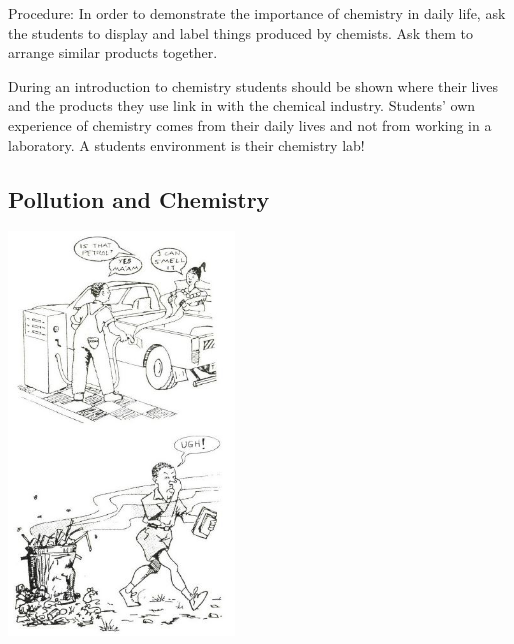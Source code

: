 \begin{multicols}{2}
\begin{description*}
\item[Procedure:]{In order to demonstrate the importance of
chemistry in daily life, ask the students to display
and label things produced by chemists. Ask
them to arrange similar products together.}
\end{description*}

\columnbreak

During an introduction to chemistry students
should be shown where their lives and the
products they use link in with the chemical
industry.
Students' own experience of chemistry comes
from their daily lives and not from working in a
laboratory. A students environment is their
chemistry lab!

\subsection{Pollution and Chemistry} 

\begin{center}
\includegraphics[width=0.45\textwidth]{./img/source/chemical-pollution.jpg}
\end{center}


\end{multicols}
